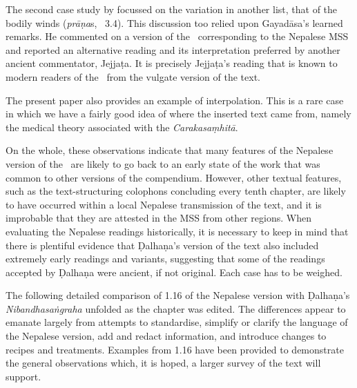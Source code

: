The second case study by \citet{kleb-2021b} focussed on the variation in another
list, that of the bodily winds (\emph{prāṇa}s, \SS\ 3.4).
This  discussion  too relied upon Gayadāsa's learned remarks. 
He commented on a version of the \SS\ corresponding to the Nepalese MSS 
and reported an alternative reading and its interpretation preferred
by another ancient commentator, Jejjaṭa.  It is precisely 
Jejjaṭa's reading that is known to modern
readers of the \SS\ from the vulgate version of the text. 

The present paper also provides an example of
interpolation.  This is a rare case in which we have a fairly good idea of where
the inserted text came from, namely the medical theory associated with the
\emph{Carakasaṃhitā}.


On the whole, these observations indicate that many features of the Nepalese version of the 
\SS\ are likely to go back to an early state of the work that was common to other versions of 
the compendium. 
However, other textual features, such as the text-structuring colophons concluding every 
tenth chapter, are likely to have occurred within a local Nepalese transmission of the text, 
and it is improbable that they are attested in the MSS from other regions. 
When evaluating the Nepalese readings historically, it is necessary to keep in mind that there 
is plentiful evidence that Ḍalhaṇa's version of the text also included extremely early 
readings and variants, suggesting that some of the readings accepted by Ḍalhaṇa were 
ancient, if not original.  Each case has to be weighed. 


The following detailed comparison of 1.16 of the Nepalese version with Ḍalhaṇa's 
\emph{Nibandhasaṅgraha} unfolded as the chapter was edited. The differences appear to 
emanate largely from attempts to standardise, simplify or clarify the language of the 
Nepalese version, add and redact information, and introduce changes to recipes and 
treatments. Examples from 1.16 have been provided to demonstrate the general 
observations which, it is hoped, a larger survey of the text will support.

